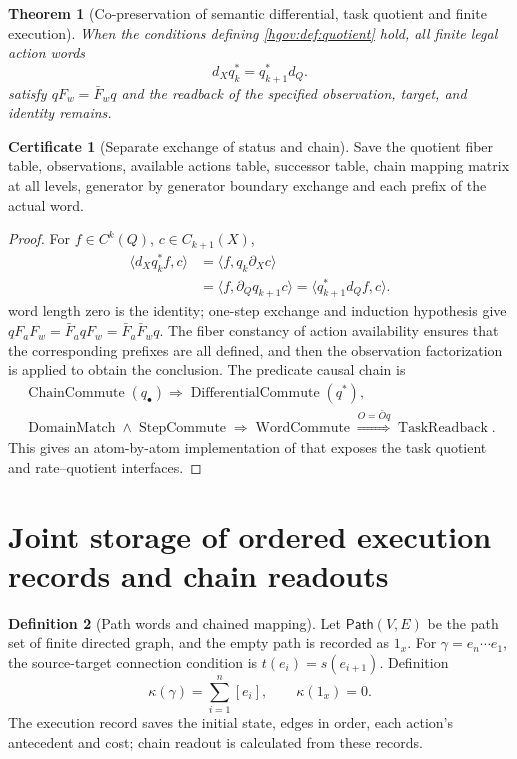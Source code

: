 \documentclass[12pt,a4paper,openany,notitlepage]{report}
\theoremstyle{plain}
\newtheorem{theorem}{Theorem}[chapter]
\theoremstyle{definition}
\newtheorem{definition}[theorem]{Definition}
\newtheorem*{certificate}{Certificate}
\theoremstyle{remark}
\begin{document}
\begin{CJK*}
\begin{theorem}
[Co-preservation of semantic differential, task quotient and finite execution]\label{hgov:thm:quotient}
When the conditions defining \ref{hgov:def:quotient} hold, all finite legal action words \[
d_Xq_k^*=q_{k+1}^*d_Q.
\] satisfy $qF_w=\bar F_wq$ and the readback of the specified observation, target, and identity remains.\end{theorem}
\begin{certificate}
[Separate exchange of status and chain]Save the quotient fiber table, observations, available actions table, successor table, chain mapping matrix at all levels, generator by generator boundary exchange and each prefix of the actual word.\end{certificate}
\begin{proof}
For $f\in C^k(Q)$, $c\in C_{k+1}(X)$, \[
\begin{aligned}
\langle d_Xq_k^*f,c\rangle
&=\langle f,q_k\partial_Xc\rangle\\
&=\langle f,\partial_Qq_{k+1}c\rangle
=\langle q_{k+1}^*d_Qf,c\rangle.
\end{aligned}
\] word length zero is the identity; one-step exchange and induction hypothesis give $qF_aF_w=\bar F_aqF_w=\bar F_a\bar F_wq$. The fiber constancy of action availability ensures that the corresponding prefixes are all defined, and then the observation factorization is applied to obtain the conclusion. The predicate causal chain is \[
\begin{gathered}
\operatorname{ChainCommute}(q_\bullet)
\Rightarrow\operatorname{DifferentialCommute}(q^*),\\
\operatorname{DomainMatch}\land\operatorname{StepCommute}
\Rightarrow\operatorname{WordCommute}
\overset{O=\bar Oq}{\Rightarrow}\operatorname{TaskReadback}.
\end{gathered}
\] This gives an atom-by-atom implementation of \cite{S38,GFrameworkSynthesis} that exposes the task quotient and rate--quotient interfaces.\end{proof}


\section { Joint storage of ordered execution records and chain readouts }

\begin{definition}
[Path words and chained mapping]\label{exp:task:word}
Let $\mathsf{Path}(V,E)$ be the path set of finite directed graph, and the empty path is recorded as $1_x$. For $\gamma=e_n\cdots e_1$, the source-target connection condition is $t(e_i)=s(e_{i+1})$. Definition \[
 \kappa(\gamma)=\sum_{i=1}^{n}[e_i],\qquad
 \kappa(1_x)=0.
\] The execution record saves the initial state, edges in order, each action's antecedent and cost; chain readout is calculated from these records.\end{definition}



\end{CJK*}
\end{document}
